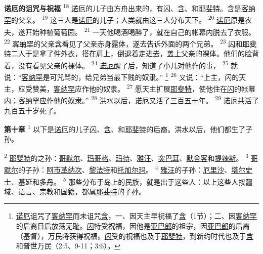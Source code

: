 \textbf{诺厄的诅咒与祝福\quad}
\textsuperscript{18}
\uline{诺厄}的儿子由方舟出来的，有\uline{闪}、\uline{含}、和\uline{耶斐特}。含是\uline{客纳罕}的父亲。
\textsuperscript{19}
这三人是\uline{诺厄}的儿子；人类就由这三人分布天下。
\textsuperscript{20}
\uline{诺厄}原是农夫，遂开始种植葡萄园。
\textsuperscript{21}
一天他喝酒喝醉了，就在自己的帐幕内脱去了衣服。
\textsuperscript{22}
\uline{客纳罕}的父亲\uline{含}看见了父亲赤身露体，遂去告诉外面的两个兄弟。
\textsuperscript{23}
\uline{闪}和\uline{耶斐特}二人于是拿了件外衣，搭在肩上，倒退着走进去，盖上父亲的裸体。他们的脸背着，没有看见父亲的裸体。
\textsuperscript{24}
\uline{诺厄}醒了后，知道了小儿对他作的事，
\textsuperscript{25}
就说：“\uline{客纳罕}是可咒骂的，给兄弟当最下贱的奴隶。”
\footnote{\uline{诺厄}诅咒了\uline{客纳罕}而未诅咒\uline{含}，一、因天主早祝福了\uline{含}（1节）；二、因\uline{客纳罕}的后裔日后放荡无耻。\uline{闪}特受祝福，因他是\uline{亚巴郎}的祖宗，因\uline{亚巴郎}的后裔（基督），万民将获得祝福。\uline{闪}受的祝福也及于\uline{耶斐特}，到新约时代也及于\uline{含}和普世万民（2:5、9-11；3:6）。}
\textsuperscript{26}
又说：“上主，闪的天主，应受赞美，\uline{客纳罕}应作他的奴隶。
\textsuperscript{27}
愿天主扩展\uline{耶斐特}，使他住在\uline{闪}的帐幕内；\uline{客纳罕}应作他的奴隶。”
\textsuperscript{28}
洪水以后，\uline{诺厄}又活了三百五十年。
\textsuperscript{29}
\uline{诺厄}共活了九百五十岁死了。

\textbf{第十章\quad}
\textsuperscript{1}
以下是\uline{诺厄}的儿子\uline{闪}、\uline{含}、和\uline{耶斐特}的后裔。洪水以后，他们都生了子孙。

\textsuperscript{2}
\uline{耶斐特}的之孙：\uline{哥默尔}、\uline{玛哥格}、\uline{玛待}、\uline{雅汪}、\uline{突巴耳}、\uline{默舍客}和\uline{提辣斯}。
\textsuperscript{3}
\uline{哥默尔}的子孙：\uline{阿市}\uline{革纳次}、\uline{黎法特}和\uline{托加尔玛}。
\textsuperscript{4}
\uline{雅汪}的子孙：\uline{厄里沙}、\uline{塔尔史士}、\uline{基延}和\uline{多丹}。
\textsuperscript{5}
那些分布于岛上的民族，就是出于这些人：以上这些人按疆域、语言、宗教和国籍，都属\uline{耶斐特}的子孙。

